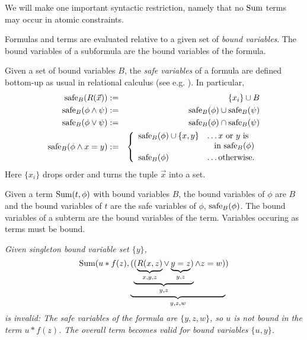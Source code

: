 We will make one important syntactic restriction, namely that
no $\mbox{Sum}$ terms may occur in atomic constraints.

Formulas and terms are evaluated relative to a given set of
{\em bound variables}.
The bound variables of a subformula are the bound variables of the formula.

Given a set of bound variables $B$,
the {\em safe variables} of a formula are defined bottom-up
as usual in relational
calculus (see e.g. \cite{AHV95}). In particular,
\begin{eqnarray*}
\mbox{safe}_B(R(\vec{x})) &:=& \{x_i\} \cup B \\
\mbox{safe}_B(\phi \land \psi) &:=& \mbox{safe}_B(\phi) \cup \mbox{safe}_B(\psi) \\
\mbox{safe}_B(\phi \lor \psi)  &:=& \mbox{safe}_B(\phi) \cap \mbox{safe}_B(\psi) \\
\mbox{safe}_B(\phi \land x = y) &:=&
\left\{\begin{array}{ll}
\mbox{safe}_B(\phi) \cup \{ x, y \} &\dots
\mbox{$x$ or $y$ is} \\
&\;\;\; \mbox{in $\mbox{safe}_B(\phi)$} \\[.5ex]
\mbox{safe}_B(\phi) &\dots \mbox{otherwise}.
\end{array} \right.
\end{eqnarray*}
Here $\{x_i\}$ drops order and turns the tuple $\vec{x}$ into a set.

Given a term $\mbox{Sum}(t, \phi)$ with bound variables $B$,
the bound variables of $\phi$ are $B$ and the bound variables of $t$ are
the safe variables of $\phi$, $\mbox{safe}_B(\phi)$.
The bound variables of a subterm are the bound variables of the term.
Variables occuring as terms must be bound.

\begin{example}\em
Given singleton bound variable set $\{ y \}$,
\[ \mbox{Sum}(u * f(z), \underbrace{(\underbrace{(\underbrace{R(x, z)}_{x,y,z} \lor \underbrace{y=z}_{y,z})}_{y,z} \land z = w)}_{y,z,w}) \]
is invalid: The safe variables of the formula are
$\{y,z,w\}$, so $u$ is not bound in the term $u * f(z)$. The overall term
becomes valid for bound variables $\{u,y\}$.
\punto
\end{example}


\def\db{{\cal{A}}}

